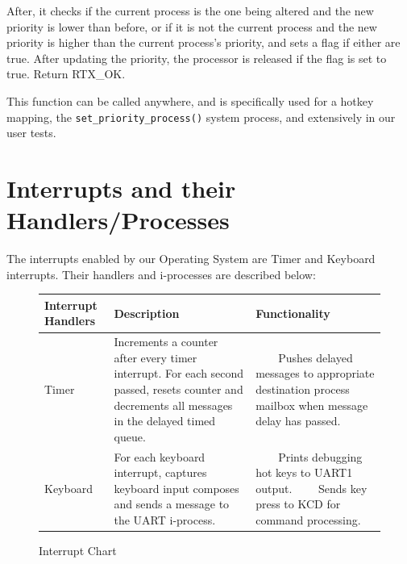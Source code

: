 \documentclass[11pt, oneside]{article}
\newcommand{\tabitem}{~~\llap{\textbullet}~~}
\begin{document}
After, it checks if the current process is the one being altered and the new priority is lower than before, or if it is not the current process and the new priority is higher than the current process's priority, and sets a flag if either are true. After updating the priority, the processor is released if the flag is set to true. Return RTX\_OK.

This function can be called anywhere, and is specifically used for a hotkey mapping, the {\tt set\_priority\_process()} system process, and extensively in our user tests.

\section{Interrupts and their Handlers/Processes}
The interrupts enabled by our Operating System are Timer and Keyboard interrupts. Their handlers and i-processes are described below:
\begin{figure}[ht!]
\centering
\begin{tabular}{|L{2cm}|L{6cm}|L{7cm}|} \hline
 \textbf{Interrupt Handlers} & \textbf{Description} & \textbf{Functionality} \\ \hline
Timer &
Increments a counter after every timer interrupt. For each second passed, resets counter and decrements all messages in the delayed timed queue.
&
\tabitem Pushes delayed messages to appropriate destination process mailbox when message delay has passed.
\\ \hline
Keyboard & For each keyboard interrupt, captures keyboard input composes and sends a message to the UART i-process. &

\tabitem Prints debugging hot keys to UART1 output. \newline
\tabitem Sends key press to KCD for command processing. \\ \hline
\end{tabular}
\caption{Interrupt Chart \label{overflow}}
\end{figure}
\end{document}
